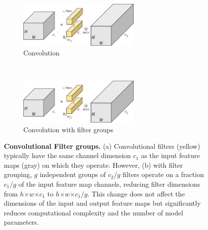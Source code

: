 \documentclass[thesis]{subfiles}
\begin{document}
	\begin{figure}[tbp]
		\begin{subfigure}[b]{0.95\textwidth}
			\centering
			\includegraphics[width=0.66\textwidth, page=1]{Figs/PDF/groupfig}
			\caption{Convolution}\label{fig:normalconv}
		\end{subfigure}
		~
		\begin{subfigure}[b]{0.95\textwidth}
			\centering
			\includegraphics[width=0.66\textwidth, page=2]{Figs/PDF/groupfig}
			\caption{Convolution with filter groups}\label{fig:groupedconv}
		\end{subfigure}
		\caption[Convolutional filter groups]{\textbf{Convolutional Filter groups.} (a) Convolutional filters (yellow) typically have the same channel dimension $c_1$ as the input feature maps (gray) on which they operate. However, (b) with filter grouping, $g$ independent groups of $c_2/g$ filters operate on a fraction $c_1/g$ of the input feature map channels, reducing filter dimensions from $h$$\times$$w$$\times$$c_1$ to $h$$\times$$w$$\times$$c_1/g$. This change does not affect the dimensions of the input and output feature maps but significantly reduces computational complexity and the number of model parameters.}\label{fig:groupconfig}
	\end{figure}
\end{document}
